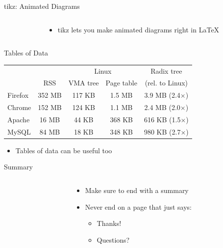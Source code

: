 \documentclass[aspectratio=169]{beamer}
\newcommand{\bi}{\begin{itemize}}
\newcommand{\ei}{\end{itemize}}
\begin{document}
\begin{frame}{tikz: Animated Diagrams}
  \begin{columns}[T]
    \begin{column}{0.1\textwidth}
        \vspace{2cm}
    \end{column}
    \begin{column}{0.6\textwidth}
      \bi
    \item tikz lets you make animated diagrams right in \LaTeX
      \ei
    \end{column}
  \end{columns}
\end{frame}

\begin{frame}{Tables of Data}
  \begin{center}
    \begin{tabular}{ l | c | c c | c }
              &        & \multicolumn{2}{c|}{Linux} & Radix tree \\
              & RSS    & VMA tree & Page table      & (rel. to Linux) \\
      \hline
      Firefox & 352 MB & 117 KB   & 1.5 MB          & 3.9 MB (2.4$\times$) \\
      Chrome  & 152 MB & 124 KB   & 1.1 MB          & 2.4 MB (2.0$\times$) \\
      Apache  & 16 MB  & 44 KB    & 368 KB          & 616 KB (1.5$\times$) \\
      MySQL   & 84 MB  & 18 KB    & 348 KB          & 980 KB (2.7$\times$) \\
    \end{tabular}
    \vspace{1em}
    \bi
  \item Tables of data can be useful too
    \ei
  \end{center}
\end{frame}

\begin{frame}{Summary}
  \begin{columns}[T]
    \begin{column}{0.5\textwidth}
    \end{column}
    \begin{column}{0.5\textwidth}
      \bi
    \item Make sure to end with a summary
    \item Never end on a page that just says:
      \bi
    \item Thanks!
    \item Questions?
      \ei
      \ei
    \end{column}
  \end{columns}
\end{frame}
\end{document}
